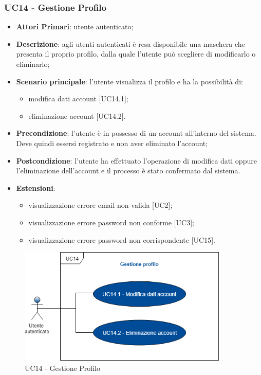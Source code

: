 \subsubsection{UC14 - Gestione Profilo}
\begin{itemize}
	\item \textbf{Attori Primari}: utente autenticato;
	\item \textbf{Descrizione}: agli utenti autenticati è resa disponibile una maschera che presenta il proprio profilo, dalla quale l'utente può scegliere di modificarlo o eliminarlo;
	\item \textbf{Scenario principale}: l'utente visualizza il profilo e ha la possibilità di: 
	\begin{itemize}
		\item modifica dati account [UC14.1];
		\item eliminazione account [UC14.2].
	\end{itemize}
	\item \textbf{Precondizione}: l'utente è in possesso di un account all'interno del sistema. Deve quindi essersi registrato e non aver eliminato l'account;
	\item \textbf{Postcondizione}: l'utente ha effettuato l'operazione di modifica dati oppure l'eliminazione dell'account e il processo è stato confermato dal sistema.
	\item \textbf{Estensioni}:
	\begin{itemize}
		\item visualizzazione errore email non valida [UC2];
		\item visualizzazione errore password non conforme [UC3];
		\item visualizzazione errore password non corrispondente [UC15].
	\end{itemize}
\end{itemize}
\begin{figure}[h]
	\includegraphics[width=10cm]{res/images/UC14Profilo.png}
	\centering
	\caption{UC14 - Gestione Profilo}
\end{figure} 
